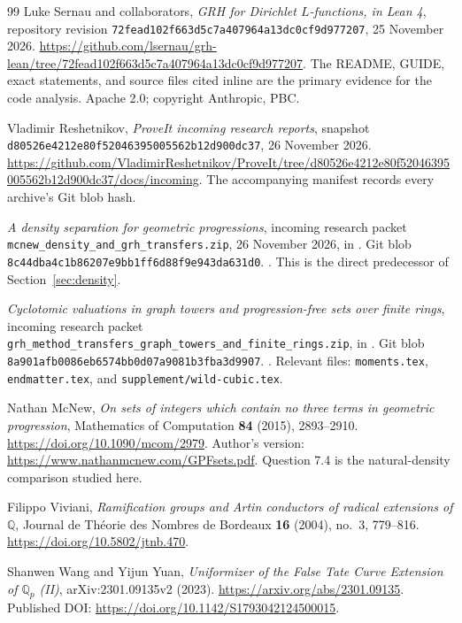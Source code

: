 \begin{thebibliography}{99}
Luke Sernau and collaborators,
\emph{GRH for Dirichlet $L$-functions, in Lean 4},
repository revision \texttt{72fead102f663d5c7a407964a13dc0cf9d977207},
25 November 2026.
\url{https://github.com/lsernau/grh-lean/tree/72fead102f663d5c7a407964a13dc0cf9d977207}.
The README, GUIDE, exact statements, and source files cited inline are the primary
evidence for the code analysis. Apache 2.0; copyright Anthropic, PBC.

Vladimir Reshetnikov, \emph{ProveIt incoming research reports},
snapshot \texttt{d80526e4212e80f52046395005562b12d900dc37},
26 November 2026.
\url{https://github.com/VladimirReshetnikov/ProveIt/tree/d80526e4212e80f52046395005562b12d900dc37/docs/incoming}.
The accompanying manifest records every archive's Git blob hash.

\emph{A density separation for geometric progressions},
incoming research packet \texttt{mcnew\_density\_and\_grh\_transfers.zip},
26 November 2026, in \cite{incoming}.
Git blob \texttt{8c44dba4c1b86207e9bb1ff6d88f9e943da631d0}.
.
This is the direct predecessor of Section~\ref{sec:density}.

\emph{Cyclotomic valuations in graph towers and progression-free sets over finite rings},
incoming research packet
\texttt{grh\_method\_transfers\_graph\_towers\_and\_finite\_rings.zip},
in \cite{incoming}.
Git blob \texttt{8a901afb0086eb6574bb0d07a9081b3fba3d9907}.
.
Relevant files: \texttt{moments.tex}, \texttt{endmatter.tex}, and
\texttt{supplement/wild-cubic.tex}.

Nathan McNew, \emph{On sets of integers which contain no three terms in geometric
progression}, Mathematics of Computation \textbf{84} (2015), 2893--2910.
\url{https://doi.org/10.1090/mcom/2979}.
Author's version: \url{https://www.nathanmcnew.com/GPFsets.pdf}.
Question 7.4 is the natural-density comparison studied here.

Filippo Viviani, \emph{Ramification groups and Artin conductors of radical
extensions of $\mathbb Q$}, Journal de Th\'eorie des Nombres de Bordeaux
\textbf{16} (2004), no.~3, 779--816.
\url{https://doi.org/10.5802/jtnb.470}.

Shanwen Wang and Yijun Yuan,
\emph{Uniformizer of the False Tate Curve Extension of $\mathbb Q_p$ (II)},
arXiv:2301.09135v2 (2023).
\url{https://arxiv.org/abs/2301.09135}.
Published DOI: \url{https://doi.org/10.1142/S1793042124500015}.


\end{thebibliography}
